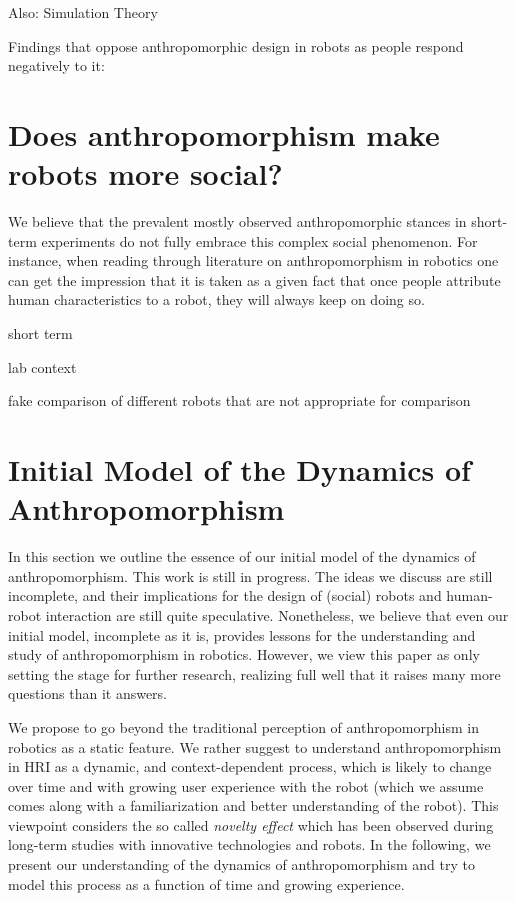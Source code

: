 \documentclass[twocolumn]{svjour3}          %
\begin{document}
	Also: Simulation Theory

	Findings that oppose anthropomorphic design in robots as people respond negatively to it:
	
	
%
%
%
%
%
%

\section{Does anthropomorphism make robots more social?}
\label{sec:6}

We believe that the prevalent mostly observed anthropomorphic stances in short-term experiments do not fully embrace this complex social phenomenon. For instance, when reading through literature on anthropomorphism in robotics one can get the impression that it is taken as a given fact that once people attribute human characteristics to a robot, they will always keep on doing so.
	
	short term
	
	lab context
	
	fake comparison of different robots that are not appropriate for comparison	
	
	
%
%
%
%
%
%

\section{Initial Model of the Dynamics of Anthropomorphism}
\label{sec:7}	

In this section we outline the essence of our initial model of the dynamics of anthropomorphism. This work is still in progress. The ideas we discuss are still incomplete, and their implications for the design of (social) robots and human-robot interaction are still quite speculative. Nonetheless, we believe that even our initial model, incomplete as it is, provides lessons for the understanding and study of anthropomorphism in robotics. However, we view this paper as only setting the stage for further research, realizing full well that it raises many more questions than it answers.

We propose to go beyond the traditional perception of anthropomorphism in robotics as a static feature.  We rather suggest to understand anthropomorphism in HRI as a dynamic, and context-dependent process, which is likely to change over time and with growing user experience with the robot (which we assume comes along with a familiarization and better understanding of the robot). This viewpoint considers the so called \textit{novelty effect} which has been observed during long-term studies with innovative technologies and robots. In the following, we present our understanding of the dynamics of anthropomorphism and try to model this process as a function of time and growing experience.
 
\end{document}
